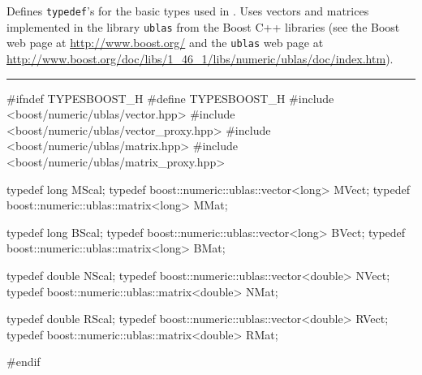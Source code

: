 % 
% 
% 
% 


Defines \texttt{typedef}'s for the basic types used in 
\latbuild.%
Uses vectors and matrices implemented in the library
\texttt{ublas} from the Boost C++ libraries
(see the Boost web page at \url{http://www.boost.org/} and the 
\texttt{ublas} web page at
\url{http://www.boost.org/doc/libs/1_46_1/libs/numeric/ublas/doc/index.htm}).
 \label{mod:TypesBoost} 


\bigskip\hrule
\code\hide
#ifndef TYPESBOOST_H
#define TYPESBOOST_H
\endhide
#include <boost/numeric/ublas/vector.hpp>
#include <boost/numeric/ublas/vector_proxy.hpp>
#include <boost/numeric/ublas/matrix.hpp>
#include <boost/numeric/ublas/matrix_proxy.hpp>


typedef long                                 MScal;
typedef boost::numeric::ublas::vector<long>  MVect;
typedef boost::numeric::ublas::matrix<long>  MMat;

typedef long                                 BScal;
typedef boost::numeric::ublas::vector<long>  BVect;
typedef boost::numeric::ublas::matrix<long>  BMat;

typedef double                                 NScal;
typedef boost::numeric::ublas::vector<double>  NVect;
typedef boost::numeric::ublas::matrix<double>  NMat;

typedef double                                 RScal;
typedef boost::numeric::ublas::vector<double>  RVect;
typedef boost::numeric::ublas::matrix<double>  RMat;

\hide
#endif
\endhide
\endcode
